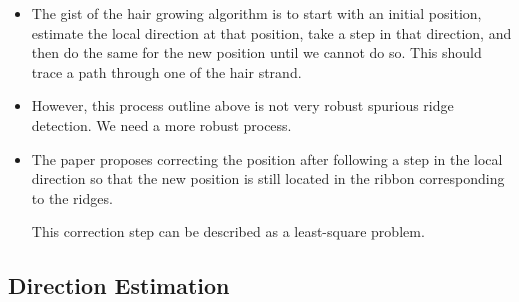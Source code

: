 \documentclass[10pt]{article}
\begin{document}
	\begin{itemize}
	  \item The gist of the hair growing algorithm is to start with an initial position, estimate the local direction at that position, take a step in that direction, and then do the same for the new position until we cannot do so. This should trace a path through one of the hair strand.
	  
	  \item However, this process outline above is not very robust spurious ridge detection. We need a more robust process.
	  
	  \item The paper proposes correcting the position after following a step in the local direction so that the new position is still located in the ribbon corresponding to the ridges.
	  
	  This correction step can be described as a least-square problem.	  
	\end{itemize}

	  \subsection{Direction Estimation} %
	  \label{sub:direction_estimation}
	  
\end{document}

